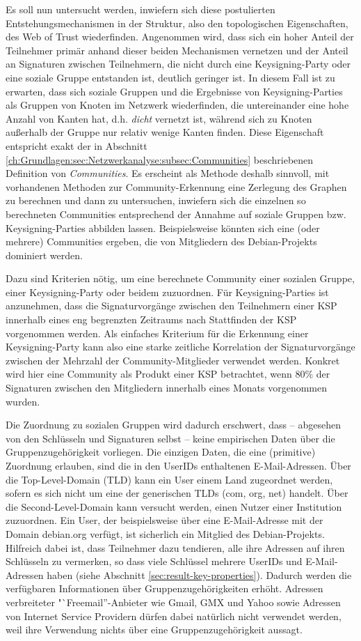 Es soll nun untersucht werden, inwiefern sich diese postulierten
Entstehungsmechanismen in der Struktur, also den topologischen
Eigenschaften, des Web of Trust wiederfinden. Angenommen wird, dass
sich ein hoher Anteil der Teilnehmer primär anhand dieser beiden
Mechanismen vernetzen und der Anteil an Signaturen zwischen
Teilnehmern, die nicht durch eine Keysigning-Party oder eine soziale
Gruppe entstanden ist, deutlich geringer ist. In diesem Fall ist zu
erwarten, dass sich soziale Gruppen und die Ergebnisse von
Keysigning-Parties als Gruppen von Knoten im Netzwerk wiederfinden,
die untereinander eine hohe Anzahl von Kanten hat, d.h. \emph{dicht}
vernetzt ist, während sich zu Knoten außerhalb der Gruppe nur
relativ wenige Kanten finden. Diese Eigenschaft entspricht exakt der
in Abschnitt
\ref{ch:Grundlagen:sec:Netzwerkanalyse:subsec:Communities}
beschriebenen Definition von \emph{Communities}. Es erscheint als
Methode deshalb sinnvoll, mit vorhandenen Methoden zur
Community-Erkennung eine Zerlegung des Graphen zu berechnen und dann
zu untersuchen, inwiefern sich die einzelnen so berechneten
Communities entsprechend der Annahme auf soziale Gruppen
bzw. Keysigning-Parties abbilden lassen. Beispielsweise könnten sich
eine (oder mehrere) Communities ergeben, die von Mitgliedern des
Debian-Projekts dominiert werden.

Dazu sind Kriterien nötig, um eine berechnete Community einer
sozialen Gruppe, einer Keysigning-Party oder beidem zuzuordnen. Für
Keysigning-Parties ist anzunehmen, dass die Signaturvorgänge
zwischen den Teilnehmern einer KSP innerhalb eines eng begrenzten
Zeitraums nach Stattfinden der KSP vorgenommen werden. Als einfaches
Kriterium für die Erkennung einer Keysigning-Party kann also eine
starke zeitliche Korrelation der Signaturvorgänge zwischen der
Mehrzahl der Community-Mitglieder verwendet werden. Konkret wird hier
eine Community als Produkt einer KSP betrachtet, wenn 80\% der
Signaturen zwischen den Mitgliedern innerhalb eines Monats vorgenommen
wurden.

Die Zuordnung zu sozialen Gruppen wird dadurch erschwert, dass --
abgesehen von den Schlüsseln und Signaturen selbst -- keine
empirischen Daten über die Gruppenzugehörigkeit vorliegen. Die
einzigen Daten, die eine (primitive) Zuordnung erlauben, sind die in
den UserIDs enthaltenen E-Mail-Adressen. Über die Top-Level-Domain
(TLD) kann ein User einem Land zugeordnet werden, sofern es sich nicht
um eine der generischen TLDs (com, org, net) handelt. Über die
Second-Level-Domain kann versucht werden, einen Nutzer einer
Institution zuzuordnen. Ein User, der beispielsweise über eine
E-Mail-Adresse mit der Domain debian.org verfügt, ist sicherlich ein
Mitglied des Debian-Projekts. Hilfreich dabei ist, dass Teilnehmer
dazu tendieren, alle ihre Adressen auf ihren Schlüsseln zu
vermerken, so dass viele Schlüssel mehrere UserIDs und
E-Mail-Adressen haben (siehe Abschnitt
\ref{sec:result-key-properties}). Dadurch werden die verfügbaren
Informationen über Gruppenzugehörigkeiten erhöht. Adressen
verbreiteter "`Freemail''-Anbieter wie Gmail, GMX und Yahoo sowie
Adressen von Internet Service Providern dürfen dabei natürlich
nicht verwendet werden, weil ihre Verwendung nichts über eine
Gruppenzugehörigkeit aussagt.


